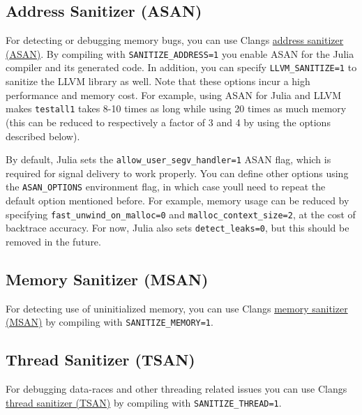 \subsection{Address Sanitizer (ASAN)}



For detecting or debugging memory bugs, you can use Clang{\textquotesingle}s \href{http://clang.llvm.org/docs/AddressSanitizer.html}{address sanitizer (ASAN)}. By compiling with \texttt{SANITIZE\_ADDRESS=1} you enable ASAN for the Julia compiler and its generated code. In addition, you can specify \texttt{LLVM\_SANITIZE=1} to sanitize the LLVM library as well. Note that these options incur a high performance and memory cost. For example, using ASAN for Julia and LLVM makes \texttt{testall1} takes 8-10 times as long while using 20 times as much memory (this can be reduced to respectively a factor of 3 and 4 by using the options described below).



By default, Julia sets the \texttt{allow\_user\_segv\_handler=1} ASAN flag, which is required for signal delivery to work properly. You can define other options using the \texttt{ASAN\_OPTIONS} environment flag, in which case you{\textquotesingle}ll need to repeat the default option mentioned before. For example, memory usage can be reduced by specifying \texttt{fast\_unwind\_on\_malloc=0} and \texttt{malloc\_context\_size=2}, at the cost of backtrace accuracy. For now, Julia also sets \texttt{detect\_leaks=0}, but this should be removed in the future.



\hypertarget{11752764117060042950}{}


\subsection{Memory Sanitizer (MSAN)}



For detecting use of uninitialized memory, you can use Clang{\textquotesingle}s \href{http://clang.llvm.org/docs/MemorySanitizer.html}{memory sanitizer (MSAN)} by compiling with \texttt{SANITIZE\_MEMORY=1}.



\hypertarget{14311970646292028418}{}


\subsection{Thread Sanitizer (TSAN)}



For debugging data-races and other threading related issues you can use Clang{\textquotesingle}s \href{https://clang.llvm.org/docs/ThreadSanitizer.html}{thread sanitizer (TSAN)} by compiling with \texttt{SANITIZE\_THREAD=1}.

